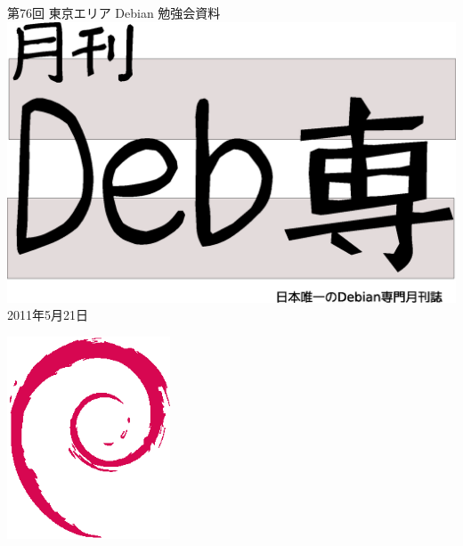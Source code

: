 \documentclass[mingoth,a4paper]{jsarticle}
\newcommand{\debmtgyear}{2011}
\newcommand{\debmtgmonth}{5}
\newcommand{\debmtgdate}{21}
\newcommand{\debmtgnumber}{76}
\begin{document}
\begin{titlepage}
\thispagestyle{empty}

\vspace*{-2cm}
第\debmtgnumber{}回 東京エリア Debian 勉強会資料\\
\hspace*{-2cm}
\includegraphics[width=210mm]{image201003/debsen.eps}\\
\hfill{}\debmtgyear{}年\debmtgmonth{}月\debmtgdate{}日



\vspace*{-2cm}
\hfill{}\includegraphics[height=6cm]{image200502/openlogo-nd.eps}
\end{titlepage}

\end{document}
